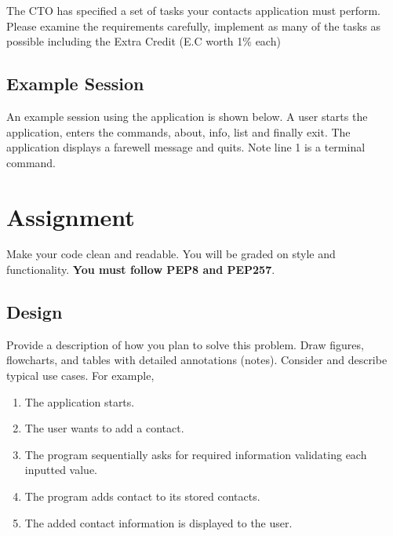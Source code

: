 \documentclass[11pt]{cselabheader}
\begin{document}
The CTO has specified a set of tasks your contacts application must
perform. Please examine the requirements carefully, implement as many
of the tasks as possible including the Extra Credit (E.C worth 1\%
each)

\subsection{Example Session}
An example session using the application is shown below. A user starts
the application, enters the commands, about, info, list and finally
exit.  The application displays a farewell message and quits.
Note line 1 is a terminal command.


\section{Assignment}
Make your code clean and readable. You will be graded on style and
functionality.  \textbf{You must follow PEP8 and PEP257}.

\subsection{Design}
Provide a description of how you plan to solve this problem. Draw figures,
flowcharts, and tables with detailed annotations (notes). Consider and describe
typical use cases. For example,

\begin{enumerate}
\item The application starts.
\item The user wants to add a contact.
\item The program sequentially asks for required information validating each
inputted value.
\item The program adds contact to its stored contacts.
\item The added contact information is displayed to the user.
\end{enumerate}
\end{document}
